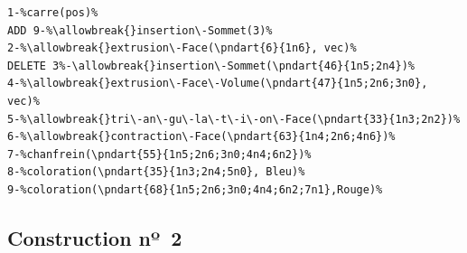 \begin{lstlisting}[escapechar=\%,
style=script-style,
caption=Spécification paramétrique éditée du cas nº~1,
label=lst:reevaluation-regles-specification-parametrique-edit-cas-1,
captionpos=b]
1-%carre(pos)%
ADD 9-%\allowbreak{}insertion\-Sommet(3)%
2-%\allowbreak{}extrusion\-Face(\pndart{6}{1n6}, vec)%
DELETE 3%-\allowbreak{}insertion\-Sommet(\pndart{46}{1n5;2n4})%
4-%\allowbreak{}extrusion\-Face\-Volume(\pndart{47}{1n5;2n6;3n0}, vec)%
5-%\allowbreak{}tri\-an\-gu\-la\-t\-i\-on\-Face(\pndart{33}{1n3;2n2})%
6-%\allowbreak{}contraction\-Face(\pndart{63}{1n4;2n6;4n6})%
7-%chanfrein(\pndart{55}{1n5;2n6;3n0;4n4;6n2})%
8-%coloration(\pndart{35}{1n3;2n4;5n0}, Bleu)%
9-%coloration(\pndart{68}{1n5;2n6;3n0;4n4;6n2;7n1},Rouge)%
\end{lstlisting}


\subsection{Construction nº~2}
\label{sec:reevaluation-base-regles-deuxieme-cas}


